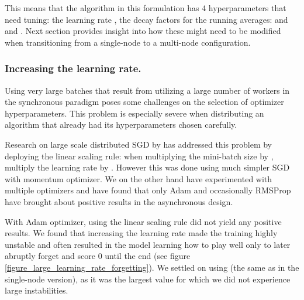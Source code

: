 \documentclass{llncs}
\begin{document}
This means that the algorithm in this formulation has 4 hyperparameters that need tuning: the learning rate , the decay factors for the running averages:  and  and . Next section provides insight into how these might need to be modified when transitioning from a single-node to a multi-node configuration.

\subsubsection{Increasing the learning rate.} Using very large batches that result from utilizing a large number of workers in the synchronous paradigm poses some challenges on the selection of optimizer hyperparameters. This problem is especially severe when distributing an algorithm that already had its hyperparameters chosen carefully.

Research on large scale distributed SGD by \cite{fair_paper} has addressed this problem by deploying the linear scaling rule: when multiplying the mini-batch size by , multiply the learning rate by . However this was done using much simpler SGD with momentum optimizer. We on the other hand have experimented with multiple optimizers and have found that only Adam \cite{adam_paper} and occasionally RMSProp \cite{rmsprop_paper} have brought about positive results in the asynchronous design.

With Adam optimizer, using the linear scaling rule did not yield any positive results. We found that increasing the learning rate made the training highly unstable and often resulted in the model learning how to play well only to later abruptly forget and score 0 until the end (see figure \ref{figure_large_learning_rate_forgetting}). We settled on using  (the same as in the single-node version), as it was the largest value for which we did not experience large instabilities.
\end{document}
